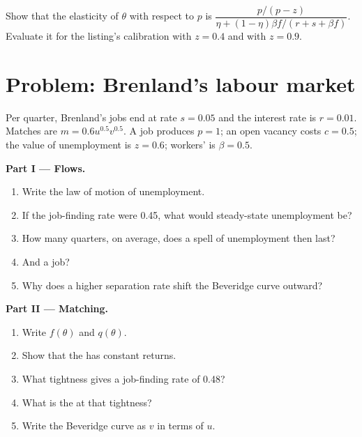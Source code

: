 \begin{exercise}[$\star\star\star$]\label{exo:b2:search-and-unemployment:12}
Show that the elasticity of $\theta$ with respect to $p$ is $\dfrac{p/(p - z)}{\eta + (1 - \eta)\beta f/(r + s + \beta f)}$. Evaluate it for the listing's calibration with $z = 0.4$ and with $z = 0.9$.
\end{exercise}

\section{Problem: Brenland's labour market}\label{sec:b2:search-and-unemployment:problem}

\begin{problem}
\label{pb:b2:search-and-unemployment:1}
Per quarter, Brenland's jobs end at rate $s = 0.05$ and the interest rate is $r = 0.01$. Matches are $m = 0.6u^{0.5}v^{0.5}$. A job produces $p = 1$; an open vacancy costs $c = 0.5$; the value of
unemployment is $z = 0.6$; workers'  is $\beta = 0.5$.

\medskip
\noindent\textbf{Part I --- Flows.}
\begin{enumerate}
  \item Write the law of motion of unemployment.
  \item If the job-finding rate were 0.45, what would steady-state unemployment be?
  \item How many quarters, on average, does a spell of unemployment then last?
  \item And a job?
  \item Why does a higher separation rate shift the Beveridge curve outward?
\end{enumerate}

\medskip
\noindent\textbf{Part II --- Matching.}
\begin{enumerate}[resume]
  \item Write $f(\theta)$ and $q(\theta)$.
  \item Show that the  has constant returns.
  \item What tightness gives a job-finding rate of 0.48?
  \item What is the  at that tightness?
  \item Write the Beveridge curve as $v$ in terms of $u$.
\end{enumerate}


\end{problem}
